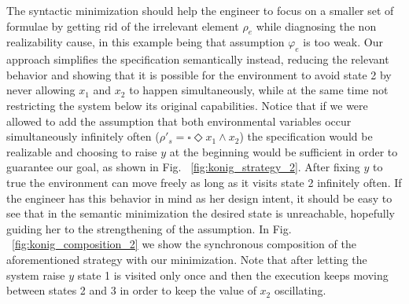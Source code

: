 The syntactic minimization should help the engineer to focus on a smaller set of formulae by getting rid of the irrelevant element $\rho_e$ while diagnosing the non realizability cause, in this example being that assumption $\varphi_e$ is too weak. Our approach simplifies the specification semantically instead, reducing the relevant behavior and showing that it is possible for the environment to avoid state 2 by never allowing $x_1$ and $x_2$ to happen simultaneously, while at the same time not restricting the system below its original capabilities. Notice that if we were allowed to add the assumption that both environmental variables occur simultaneously infinitely often ($\rho'_s = \square \Diamond x_1 \wedge x_2$) the specification would be realizable and choosing to raise $y$ at the beginning would be sufficient in order to guarantee our goal, as shown in Fig. ~\ref{fig:konig_strategy_2}. After fixing $y$ to true the environment can move freely as long as it visits state 2 infinitely often. If the engineer has this behavior in mind as her design intent, it should be easy to see that in the semantic minimization the desired state is unreachable, hopefully guiding her to the strengthening of the assumption.  In Fig. ~\ref{fig:konig_composition_2} we show the synchronous composition of the aforementioned strategy with our minimization. Note that after letting the system raise $y$ state 1 is visited only once and then the execution keeps moving between states 2 and 3 in order to keep the value of $x_2$ oscillating.
